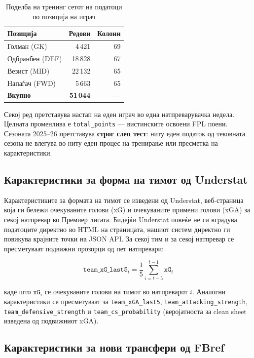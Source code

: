 \begin{table}[h]
\centering
\caption{Поделба на тренинг сетот на податоци по позиција на играч}
\label{tab:dataset_split_en}
\begin{tabular}{lrr}
\toprule
\textbf{Позиција} & \textbf{Редови} & \textbf{Колони} \\
\midrule
Голман (GK)        & 4\,421  & 69 \\
Одбранбен (DEF)    & 18\,828 & 67 \\
Везист (MID)       & 22\,132 & 65 \\
Напаѓач (FWD)      & 5\,663  & 65 \\
\midrule
\textbf{Вкупно}    & \textbf{51\,044} & — \\
\bottomrule
\end{tabular}
\end{table}

Секој ред претставува настап на еден играч во една натпреварувачка недела. Целната променлива е \texttt{total\_points} — вистинските освоени FPL поени. Сезоната 2025--26 претставува \textbf{строг слеп тест}: ниту еден податок од тековната сезона не влегува во ниту еден процес на тренирање или пресметка на карактеристики.

\subsection{Карактеристики за форма на тимот од Understat}

Карактеристиките за формата на тимот се изведени од Understat, веб-страница која ги бележи очекуваните голови (xG) и очекуваните примени голови (xGA) за секој натпревар во Премиер лигата. Бидејќи Understat повеќе не ги вградува податоците директно во HTML на страницата, нашиот систем директно ги повикува крајните точки на JSON API. За секој тим и за секој натпревар се пресметуваат подвижни прозорци од пет натпревари:

\begin{equation}
\texttt{team\_xG\_last5}_t = \frac{1}{5} \sum_{i=t-5}^{t-1} \texttt{xG}_i
\end{equation}

каде што $\texttt{xG}_i$ се очекуваните голови на тимот во натпреварот $i$. Аналогни карактеристики се пресметуваат за \texttt{team\_xGA\_last5}, \texttt{team\_attacking\_strength}, \texttt{team\_defensive\_strength} и \texttt{team\_cs\_probability} (веројатноста за clean sheet изведена од подвижниот xGA).

\subsection{Карактеристики за нови трансфери од FBref}

